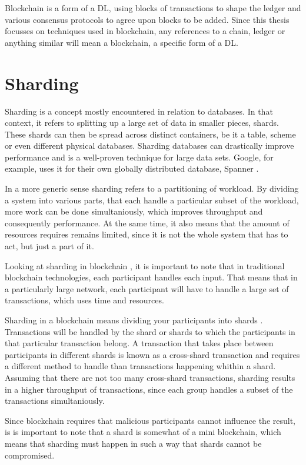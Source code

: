 Blockchain is a form of a DL, using blocks of transactions to shape the ledger and various consensus protocols to agree upon blocks to be added. Since this thesis focusses on techniques used in blockchain, any references to a chain, ledger or anything similar will mean a blockchain, a specific form of a DL.

\section{Sharding}
Sharding is a concept mostly encountered in relation to databases. \cite{DbSharding} In that context, it refers to splitting up a large set of data in smaller pieces, shards. These shards can then be spread across distinct containers, be it a table, scheme or even different physical databases. Sharding databases can drastically improve performance and is a well-proven technique for large data sets. Google, for example, uses it for their own globally distributed database, Spanner \cite{Spanner}.

In a more generic sense sharding refers to a partitioning of workload. By dividing a system into various parts, that each handle a particular subset of the workload, more work can be done simultaniously, which improves throughput and consequently performance. At the same time, it also means that the amount of resources requires remains limited, since it is not the whole system that has to act, but just a part of it.

Looking at sharding in blockchain \cite{OmniLedger}, it is important to note that in traditional blockchain technologies, each participant handles each input. That means that in a particularly large network, each participant will have to handle a large set of transactions, which uses time and resources.

Sharding in a blockchain means dividing your participants into shards \cite{OmniLedger}. Transactions will be handled by the shard or shards to which the participants in that particular transaction belong. A transaction that takes place between participants in different shards is known as a cross-shard transaction and requires a different method to handle than transactions happening whithin a shard. Assuming that there are not too many cross-shard transactions, sharding results in a higher throughput of transactions, since each group handles a subset of the transactions simultaniously.

Since blockchain requires that malicious participants cannot influence the result, is is important to note that a shard is somewhat of a mini blockchain, which means that sharding must happen in such a way that shards cannot be compromised.

